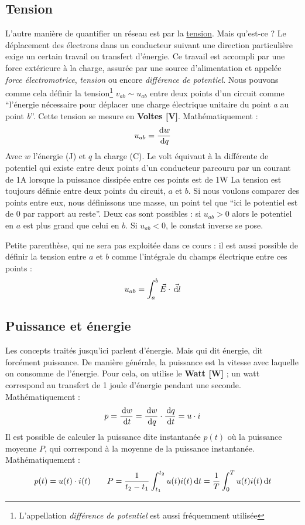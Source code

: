 \documentclass[12pt,a4paper]{article}
\begin{document}
\subsection{Tension}
\label{subsection: base tension}
L'autre manière de quantifier un réseau est par la \uline{tension}. Mais qu'est-ce ? Le déplacement des électrons dans un conducteur suivant une direction particulière exige un certain travail ou transfert d'énergie. Ce travail est accompli par une force extérieure à la charge, assurée par une source d'alimentation et appelée \textit{force électromotrice}, \textit{tension} ou encore \textit{différence de potentiel}. Nous pouvons comme cela définir la tension\footnote{L'appellation \textit{différence de potentiel} est aussi fréquemment utilisée} $v_{ab} \sim u_{ab}$ entre deux points d'un circuit comme ``l'énergie nécessaire pour déplacer une charge électrique unitaire du point \textit{a} au point \textit{b}''. Cette tension se mesure en \textbf{Voltes [V]}. Mathématiquement :
\begin{equation}
	u_{ab} = \frac{\, \mathrm d w}{\, \mathrm d q}
	\label{equ: definition tension}
\end{equation}
Avec $w$ l'énergie (J) et $q$ la charge (C). 
Le volt équivaut à la différente de potentiel qui existe entre deux points d'un conducteur parcouru par un courant de 1A lorsque la puissance dissipée entre ces points est de 1W
La tension est toujours définie entre deux points du circuit, $a$ et $b$. Si nous voulons comparer des points entre eux, nous définissons une masse, un point tel que ``ici le potentiel est de 0 par rapport au reste''. Deux cas sont possibles : si $u_{ab} > 0$ alors le potentiel en $a$ est plus grand que celui en $b$. Si $u_{ab} < 0$, le constat inverse se pose.

Petite parenthèse, qui ne sera pas exploitée dans ce cours : il est aussi possible de définir la tension entre $a$ et $b$  comme l'intégrale du champs électrique entre ces points :
\[u_{ab} = \int_a^b \vec{E} \cdot \vec{\, \mathrm d l}\]

\subsection{Puissance et énergie}
\label{subsection: puissance energie}
Les concepts traités jusqu'ici parlent d'énergie. Mais qui dit énergie, dit forcément puissance. De manière générale, la puissance est la vitesse avec laquelle on consomme de l'énergie. Pour cela, on utilise le \textbf{Watt [W]} ; un watt correspond au transfert de 1 joule d'énergie pendant une seconde. Mathématiquement :
\begin{equation}
	p= \frac{\, \mathrm d w}{\, \mathrm d t} = \frac{\, \mathrm d w}{\, \mathrm d q} \cdot \frac{\, \mathrm d q}{\, \mathrm d t} = u\cdot i
	\label{equ: definition puissance}
\end{equation}
Il est possible de calculer la puissance dite instantanée $p(t)$ où la puissance moyenne $P$, qui correspond à la moyenne de la puissance instantanée. Mathématiquement :
\begin{equation}
	p(t) = u(t)\cdot i(t) \qquad P = \frac{1}{t_2-t_1}\int_{t_1}^{t_2} u(t)i(t) \, \mathrm d t = \frac{1}{T}\int_0^T u(t)i(t)\, \mathrm d t
	\label{equ: definition puissance p=ui}
\end{equation}
\end{document}
